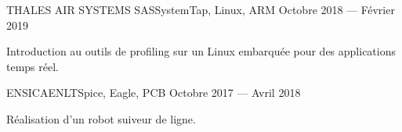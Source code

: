 \documentclass{faresume}
\begin{document}
\begin{column}[\leftcolumnwidth]
			{THALES AIR SYSTEMS SAS}{SystemTap, Linux, ARM}
			{Octobre 2018 --- F\'evrier 2019}
			{
				\begin{additems}
					\item Introduction au outils de profiling sur un Linux embarqu\'ee pour des applications temps r\'eel.
				\end{additems}
			}

			{ENSICAEN}{LTSpice, Eagle, PCB}
			{Octobre 2017 --- Avril 2018}
			{
				\begin{additems}
					\item R\'ealisation d'un robot suiveur de ligne.
				\end{additems}
			}

\end{column}
\end{document}
